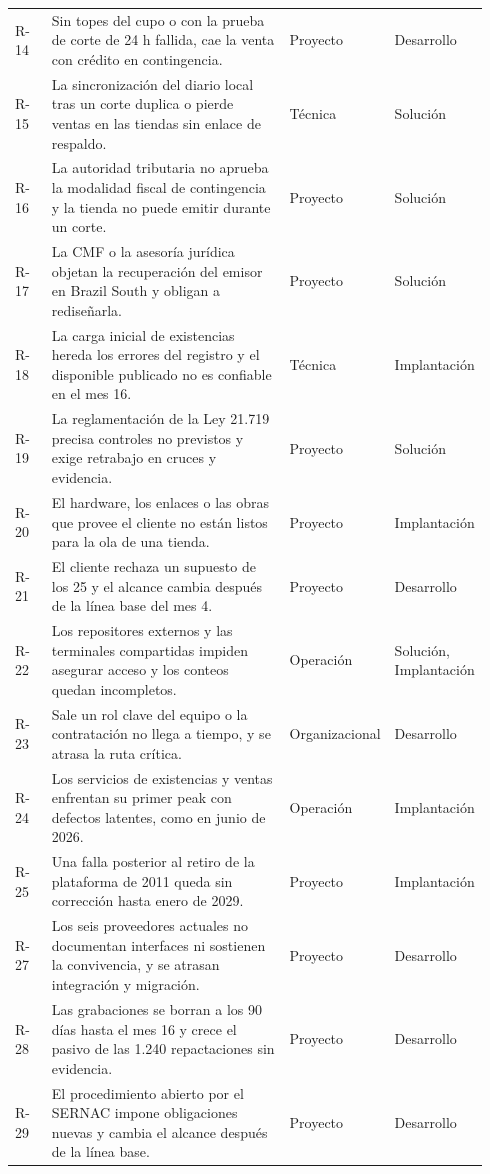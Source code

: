 \documentclass[11pt]{article}
\begin{document}
\begin{longtable}{p{0.080\linewidth}p{0.540\linewidth}p{0.160\linewidth}p{0.160\linewidth}}
R-14 & Sin topes del cupo o con la prueba de corte de 24 h fallida, cae la venta con crédito en contingencia. & Proyecto & Desarrollo \\
R-15 & La sincronización del diario local tras un corte duplica o pierde ventas en las tiendas sin enlace de respaldo. & Técnica & Solución \\
R-16 & La autoridad tributaria no aprueba la modalidad fiscal de contingencia y la tienda no puede emitir durante un corte. & Proyecto & Solución \\
R-17 & La CMF o la asesoría jurídica objetan la recuperación del emisor en Brazil South y obligan a rediseñarla. & Proyecto & Solución \\
R-18 & La carga inicial de existencias hereda los errores del registro y el disponible publicado no es confiable en el mes 16. & Técnica & Implantación \\
R-19 & La reglamentación de la Ley 21.719 precisa controles no previstos y exige retrabajo en cruces y evidencia. & Proyecto & Solución \\
R-20 & El hardware, los enlaces o las obras que provee el cliente no están listos para la ola de una tienda. & Proyecto & Implantación \\
R-21 & El cliente rechaza un supuesto de los 25 y el alcance cambia después de la línea base del mes 4. & Proyecto & Desarrollo \\
R-22 & Los repositores externos y las terminales compartidas impiden asegurar acceso y los conteos quedan incompletos. & Operación & Solución, Implantación \\
R-23 & Sale un rol clave del equipo o la contratación no llega a tiempo, y se atrasa la ruta crítica. & Organizacional & Desarrollo \\
R-24 & Los servicios de existencias y ventas enfrentan su primer peak con defectos latentes, como en junio de 2026. & Operación & Implantación \\
R-25 & Una falla posterior al retiro de la plataforma de 2011 queda sin corrección hasta enero de 2029. & Proyecto & Implantación \\
R-27 & Los seis proveedores actuales no documentan interfaces ni sostienen la convivencia, y se atrasan integración y migración. & Proyecto & Desarrollo \\
R-28 & Las grabaciones se borran a los 90 días hasta el mes 16 y crece el pasivo de las 1.240 repactaciones sin evidencia. & Proyecto & Desarrollo \\
R-29 & El procedimiento abierto por el SERNAC impone obligaciones nuevas y cambia el alcance después de la línea base. & Proyecto & Desarrollo \\

\end{longtable}
\end{document}
